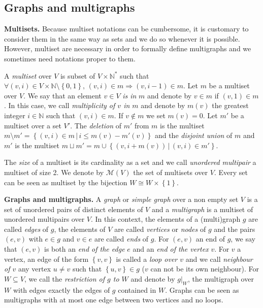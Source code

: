 \documentclass[11pt]{article}
\theoremstyle{definition}
\numberwithin{equation}{section}
\newcommand{\set}[1]{\left\{#1\right\}}
\newcommand{\N}{\mathbb{N}}
\newcommand{\m}{\mathcal{M}}
\begin{document}
\subsection{Graphs and multigraphs}\label{intro_graphs}

\textbf{Multisets.}
Because multiset notations can be cumbersome, it is customary to consider them in the same way as sets and we do so whenever it
is possible. However, multiset are necessary in order to formally define multigraphs and we sometimes need notations proper to them.

A {\em multiset} over $V$ is subset of $V\times\N^*$ such that $\forall (v,i)\in V\times\N\setminus\set{0,1},\, (v,i)\in m \Rightarrow (v,i-1)\in m$. Let $m$ be a multiset 
over $V$. We say that an element $v\in V$ {\em is in} $m$ and denote by $v\in m$ if $(v,1)\in m$. In this case, we call {\em multiplicity of $v$ in $m$} 
and denote by $m(v)$ the greatest integer $i\in\N$ such that $(v,i)\in m$. If $v\not\in m$ we set $m(v)=0$. Let $m'$ be a multiset over a set $V'$. The
{\em deletion} of $m'$ from $m$ is the multiset $m\setminus m' = \set{(v,i)\in m\,|\, i\leq m(v)-m'(v)}$ and the {\em disjoint union} of $m$ and
$m'$ is the multiset $m\sqcup m'= m\cup\set{(v,i+m(v))\,|\,(v,i)\in m'}$.

The {\em size} of a multiset is its cardinality as a set and we call {\em unordered multipair} a multiset of size 2. 
We denote by $\m(V)$ the set of multisets over $V$. 
Every set can be seen as multiset by the bijection $W\cong W\times\set{1}$.

\noindent\textbf{Graphs and multigraphs.}
A {\em graph} or {\em simple graph} over a non empty set $V$ is a set of unordered pairs of distinct elements of $V$ and a 
{\em multigraph} is a multiset of unordered multipairs over $V$. In this context, the elements of a 
(multi)graph $g$ are called {\em edges} of $g$, the elements of $V$ are called {\em vertices} or {\em nodes} of $g$ and the pairs
$(e,v)$ with $e\in g$ and $v\in e$ are called {\em ends} of $g$. For $(e,v)$ an end of $g$, we say that $(e,v)$ is both
an {\em end of the edge} $e$ and an {\em end of the vertex} $v$. For $v$ a vertex, an edge of the form $\set{v,v}$ 
is called a {\em loop over $v$} and we call {\em neighbour of $v$} any vertex $u\not = v$ such that $\set{u,v}\in g$ 
($v$ can not be its own neighbour). For $W\subseteq V$, we call the {\em restriction of $g$ to $W$} and denote by $g|_W$,
the multigraph over $W$ with edges exactly the edges of $g$ contained in $W$. 
Graphs can be seen as multigraphs with at most one edge between two vertices and no loops. 
\end{document}
